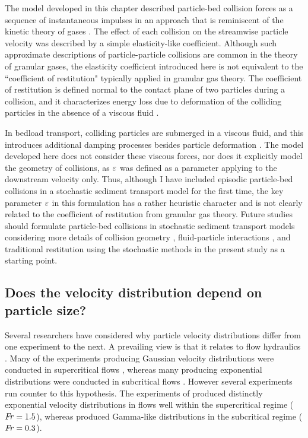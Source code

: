 The model developed in this chapter described particle-bed collision forces as a sequence of instantaneous impulses in an approach that is reminiscent of the kinetic theory of gases \citep{Landau1969,Brilliantov2004}.
The effect of each collision on the streamwise particle velocity was described by a simple elasticity-like coefficient.
Although such approximate descriptions of particle-particle collisions are common in the theory of granular gases, the elasticity coefficient introduced here is not equivalent to the ``coefficient of restitution" typically applied in granular gas theory.
The coefficient of restitution is defined normal to the contact plane of two particles during a collision, and it characterizes energy loss due to deformation of the colliding particles in the absence of a viscous fluid \citep{Brach1992,Ismail2008}.

In bedload transport, colliding particles are submerged in a viscous fluid, and this introduces additional damping processes besides particle deformation \citep{Joseph2001,Yang2006,Schmeeckle2001}.
The model developed here does not consider these viscous forces, nor does it explicitly model the geometry of collisions, as $\varepsilon$ was defined as a parameter applying to the downstream velocity only.
Thus, although I have included episodic particle-bed collisions in a stochastic sediment transport model for the first time, the key parameter $\varepsilon$ in this formulation has a rather heuristic character and is not clearly related to the coefficient of restitution from granular gas theory.
Future studies should formulate particle-bed collisions in stochastic sediment transport models considering more details of collision geometry \citep{Sekine1992}, fluid-particle interactions \citep{Marshall2011}, and traditional restitution \citep{Brach1989} using the stochastic methods in the present study as a starting point. 

\subsection{Does the velocity distribution depend on particle size?}

Several researchers have considered why particle velocity distributions differ from one experiment to the next.
A prevailing view is that it relates to flow hydraulics \citep{Wu2020}. Many of the experiments producing Gaussian velocity distributions were conducted in supercritical flows \citep[e.g.][]{Heyman2016,Martin2012,Ancey2014}, whereas many producing exponential distributions were conducted in subcritical flows \citep[e.g.][]{Fathel2015,Charru2004,Seizilles2014}.
However several experiments run counter to this hypothesis.
The experiments of \citet{Lajeunesse2010} produced distinctly exponential velocity distributions in flows well within the supercritical regime ($\mbox{\textit{Fr}}=1.5$), whereas \citet{Liu2019} produced Gamma-like distributions in the subcritical regime ($\mbox{\textit{Fr}}=0.3$).

